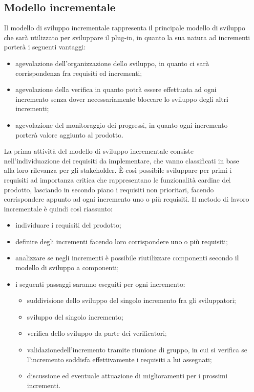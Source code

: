 \subsection{Modello incrementale}
Il modello di sviluppo incrementale rappresenta il principale modello di sviluppo che sarà utilizzato per sviluppare il plug-in, in quanto la sua natura ad incrementi porterà i seguenti vantaggi:
\begin{itemize}
	\item agevolazione dell'organizzazione dello sviluppo, in quanto ci sarà corrispondenza fra requisiti ed incrementi;
	\item agevolazione della verifica in quanto potrà essere effettuata ad ogni incremento senza dover necessariamente bloccare lo sviluppo degli altri incrementi;
	\item agevolazione del monitoraggio dei progressi, in quanto ogni incremento porterà valore aggiunto al prodotto\glo.
\end{itemize}
La prima attività del modello di sviluppo incrementale consiste nell'individuazione dei requisiti da implementare, che vanno classificati in base alla loro rilevanza per gli stakeholder\glo. È così possibile sviluppare per primi i requisiti ad importanza critica che rappresentano le funzionalità cardine del prodotto\glo, lasciando in secondo piano i requisiti non prioritari, facendo corrispondere appunto ad ogni incremento uno o più requisiti.
Il metodo di lavoro incrementale è quindi così riassunto:
\begin{itemize}
	\item individuare i requisiti del prodotto\glo;
	\item definire degli incrementi facendo loro corrispondere uno o più requisiti;
	\item analizzare se negli incrementi è possibile riutilizzare componenti secondo il modello di sviluppo a componenti;
	\item i seguenti passaggi saranno eseguiti per ogni incremento:
	\begin{itemize}
		\item suddivisione dello sviluppo del singolo incremento fra gli sviluppatori;
		\item sviluppo del singolo incremento;
		\item verifica dello sviluppo da parte dei verificatori;
		\item validazione\glosp dell'incremento tramite riunione di gruppo, in cui si verifica se l'incremento soddisfa effettivamente i requisiti a lui assegnati;
		\item discussione ed eventuale attuazione di miglioramenti per i prossimi incrementi.
	\end{itemize}
\end{itemize}

